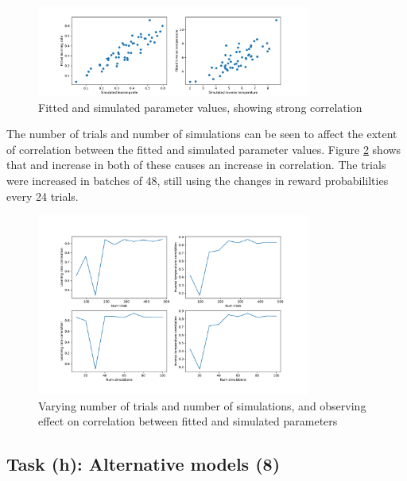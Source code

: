 \documentclass{article}
\begin{document}
\begin{figure}[H]
  \centering
  \includegraphics[width=0.8\textwidth]{figures/part2/task7/parameter_correlations.pdf}
  \caption{Fitted and simulated parameter values, showing strong correlation}
  \label{fig:parametercorrelations}
\end{figure}

The number of trials and number of simulations can be seen to affect the extent of correlation between the fitted and simulated parameter values. Figure \ref{fig:varyingnumtrialsandsimulations} shows that and increase in both of these causes an increase in correlation. The trials were increased in batches of 48, still using the changes in reward probabililties every 24 trials.

\begin{figure}[H]
  \centering
  \includegraphics[width=0.8\textwidth]{figures/part2/task7/varying_num_trials_and_simulations.pdf}
  \caption{\centering Varying number of trials and number of simulations, and observing effect on correlation between fitted and simulated parameters}
  \label{fig:varyingnumtrialsandsimulations}
\end{figure}

\subsection{Task (h): Alternative models (8)}
\end{document}
